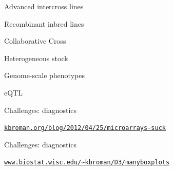 \documentclass[12pt,t]{beamer}
\begin{document}
\begin{frame}[c]{Advanced intercross lines}


\end{frame}


\begin{frame}[c]{Recombinant inbred lines}


\end{frame}


\begin{frame}[c]{Collaborative Cross}


\end{frame}





\begin{frame}[c]{Heterogeneous stock}

  \vspace{2mm}


\end{frame}


\begin{frame}[c]{Genome-scale phenotypes}
\end{frame}


\begin{frame}[c]{eQTL}
\end{frame}



\begin{frame}{Challenges: {\color{foreground} diagnostics}}

\vspace{2mm}


\vspace{3mm}

\hfill \href{http://kbroman.org/blog/2012/04/25/microarrays-suck}{\scriptsize \lolit \tt kbroman.org/blog/2012/04/25/microarrays-suck}

\end{frame}


\begin{frame}{Challenges: {\color{foreground} diagnostics}}

  \vspace{2mm}


\vspace{3mm}

\hfill
\href{https://www.biostat.wisc.edu/~kbroman/D3/manyboxplots/}{\scriptsize
  \lolit \tt www.biostat.wisc.edu/{\textasciitilde}kbroman/D3/manyboxplots}

\end{frame}
\end{document}
